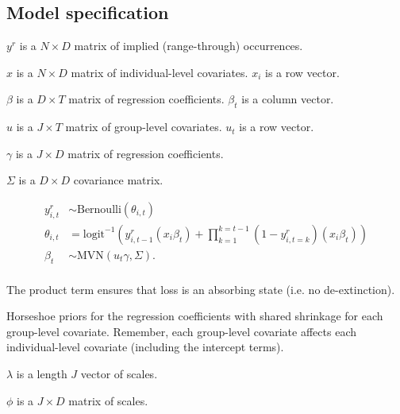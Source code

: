 \documentclass[12pt,letterpaper]{article}
\begin{document}



\subsection*{Model specification}


\(y^{r}\) is a \(N \times D\) matrix of implied (range-through) occurrences.

\(x\) is a \(N \times D\) matrix of individual-level covariates. \(x_{i}\) is a row vector.

\(\beta\) is a \(D \times T\) matrix of regression coefficients. \(\beta_{t}\) is a column vector.

\(u\) is a \(J \times T\) matrix of group-level covariates. \(u_{t}\) is a row vector.

\(\gamma\) is a \(J \times D\) matrix of regression coefficients.

\(\Sigma\) is a \(D \times D\) covariance matrix.

\begin{equation}
  \begin{aligned}
    y^{r}_{i,t} &\sim \text{Bernoulli}(\theta_{i,t}) \\
    \theta_{i, t} &= \text{logit}^{-1}(y^{r}_{i, t - 1} (x_{i} \beta_{t}) + \prod_{k = 1}^{k = t - 1}(1 - y^{r}_{i, t = k}) (x_{i} \beta_{t})) \\
    \beta_{t} &\sim \text{MVN}(u_{t} \gamma, \Sigma). \\
  \end{aligned}
  \label{<++>}
\end{equation}

The product term ensures that loss is an absorbing state (i.e. no de-extinction).


Horseshoe priors for the regression coefficients with shared shrinkage for each group-level covariate. Remember, each group-level covariate affects each individual-level covariate (including the intercept terms).

\(\lambda\) is a length \(J\) vector of scales.

\(\phi\) is a \(J \times D\) matrix of scales.
\end{document}
